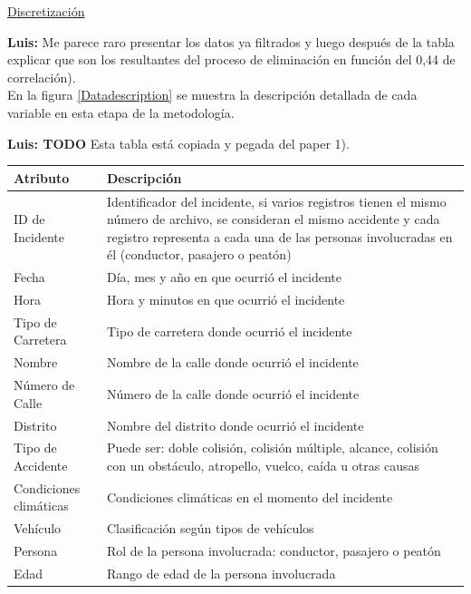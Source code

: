 \documentclass{uathesis-es}
\begin{document}
{\underline{Discretización}

\textbf{Luis: } Me parece raro presentar los datos ya filtrados y luego después de la tabla explicar que son los resultantes del proceso de eliminación en función del 0,44 de correlación).\\


En la figura \ref{Datadescription} se muestra la descripción detallada de cada variable en esta etapa de la metodología.

\textbf{Luis: TODO} Esta tabla está copiada y pegada del paper 1).\\
\begin{table}[H]
	\begin{center}
		\begin{tabular}{|p{3cm}|p{12cm}|}
			\hline
			\textbf{Atributo} & \textbf{Descripción} \\ \hline \hline
			ID de Incidente  & Identificador del incidente, si varios registros tienen el mismo número de archivo, se consideran el mismo accidente y cada registro representa a cada una de las personas involucradas en él (conductor, pasajero o peatón)  \\ \hline
			Fecha  & Día, mes y año en que ocurrió el incidente \\ \hline
			Hora  & Hora y minutos en que ocurrió el incidente \\ \hline
			Tipo de Carretera & Tipo de carretera donde ocurrió el incidente \\ \hline
			Nombre & Nombre de la calle donde ocurrió el incidente \\ \hline
			Número de Calle & Número de la calle donde ocurrió el incidente  \\ \hline
			Distrito & Nombre del distrito donde ocurrió el incidente \\ \hline
			Tipo de Accidente  & Puede ser: doble colisión, colisión múltiple, alcance, colisión con un obstáculo, atropello, vuelco, caída u otras causas \\ \hline
			Condiciones climáticas  & Condiciones climáticas en el momento del incidente \\ \hline
			Vehículo  & Clasificación según tipos de vehículos \\ \hline
			Persona  & Rol de la persona involucrada: conductor, pasajero o peatón \\ \hline
			Edad  & Rango de edad de la persona involucrada \\ \hline

\end{tabular}
\end{center}
\end{table}}
\end{document}

